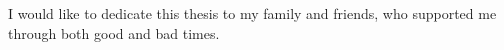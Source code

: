 

\thispagestyle{empty}

\begin{center}
I would like to dedicate this thesis to my family and friends, who supported me through both good and bad times.
\end{center}

\vspace*{\fill}
\afterpage{\blankpage}
\clearpage
